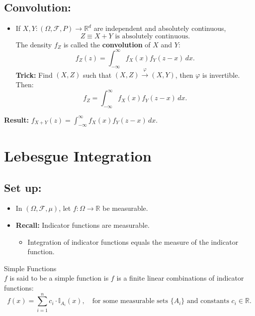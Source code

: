\subsection{Convolution:}
\begin{itemize}
    \item If \( X, Y : (\Omega, \mathscr{F}, P)  \to \mathbb{R}^d \) are independent and absolutely continuous,
    \[
    Z \equiv X + Y \text{ is absolutely continuous}.
    \]
    The density \( f_Z \) is called the \textbf{convolution} of \( X \) and \( Y \):
    \[
    f_Z(z) = \int_{-\infty}^\infty f_X(x) f_Y(z - x) \, dx.
    \]
    \textbf{Trick:} Find \( (X, Z) \) such that \( (X, Z) \xrightarrow{\varphi} (X, Y) \), then \(\varphi\) is invertible. Then:
    \[
    f_Z = \int_{-\infty}^\infty f_X(x) f_Y(z - x) \, dx.
    \]
\end{itemize}
\textbf{Result:} \( f_{X + Y}(z) = \int_{-\infty}^\infty f_X(x) f_Y(z - x) \, dx. \)


\newpage
\section{Lebesgue Integration}
\subsection{Set up:}
\begin{itemize}
    \item In \((\Omega, \mathscr{F}, \mu)\), let \( f: \Omega \to \mathbb{R} \) be measurable.
    \item \textbf{Recall:} Indicator functions are measurable.
    \begin{itemize}
        \item Integration of indicator functions equals the measure of the indicator function.
    \end{itemize}
\end{itemize}

\begin{df}{Simple Functions}\\
$f$ is said to be a simple function is $f$ is a finite linear combinations of indicator functions:
\[
f(x) = \sum_{i=1}^n c_i \cdot \mathbb{I}_{A_i}(x), \quad \text{for some measurable sets } \{A_i\} \text{ and constants } c_i \in \mathbb{R}.
\]	
\end{df}

